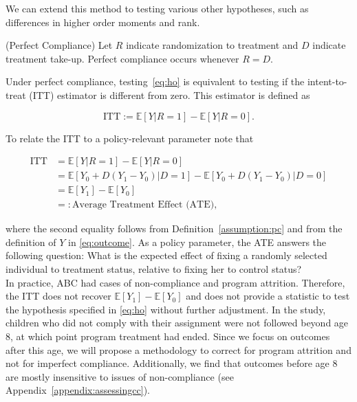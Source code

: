 \noindent We can extend this method to testing various other hypotheses, such as differences in higher order moments and rank.

\noindent \begin{definition} \label{assumption:pc} \normalfont (Perfect Compliance) Let $R$ indicate randomization to treatment and $D$ indicate treatment take-up. Perfect compliance occurs whenever  $R = D$.\end{definition}

\noindent Under perfect compliance, testing~\eqref{eq:ho} is equivalent to testing if the intent-to-treat (ITT) estimator is different from zero. This estimator is defined as 

\begin{equation}
\text{ITT} := \mathbb{E} \left[ Y | R = 1 \right] - \mathbb{E} \left[ Y | R = 0 \right]. \label{eq:itt}
\end{equation} 

\noindent To relate the ITT to a policy-relevant parameter note that

\begin{align}
\text{ITT} &= \mathbb{E} \left[ Y | R = 1 \right] - \mathbb{E} \left[ Y | R = 0 \right] \nonumber \\
	       &= \mathbb{E} \left[ Y_{0} + D \left( Y_{1} - Y_{0} \right)  | D = 1 \right] - \mathbb{E} \left[ Y_{0} + D \left( Y_{1} - Y_{0} \right)  | D = 0 \right] \nonumber \\
	       &= \mathbb{E} \left[ Y_{1} \right] - \mathbb{E} \left[ Y_{0} \right] \nonumber \\
	       &=: \text{Average Treatment Effect (ATE)}, 
\end{align} 

\noindent where the second equality follows from Definition~\ref{assumption:pc} and from the definition of $Y$ in \eqref{eq:outcome}. As a policy parameter, the ATE answers the following question: What is the expected effect of fixing a randomly selected individual to treatment status, relative to fixing her to control status?\\

\noindent In practice, ABC had cases of non-compliance and program attrition. Therefore, the ITT does not recover $ \mathbb{E} \left[ Y_{1} \right] - \mathbb{E} \left[ Y_{0} \right] $ and does not provide a statistic to test the hypothesis specified in \eqref{eq:ho} without further adjustment. In the study, children who did not comply with their assignment were not followed beyond age 8, at which point program treatment had ended. Since we focus on outcomes after this age, we will propose a methodology to correct for program attrition and not for imperfect compliance. Additionally, we find that outcomes before age 8 are mostly insensitive to issues of non-compliance (see Appendix~\ref{appendix:assessingcc}).\\

